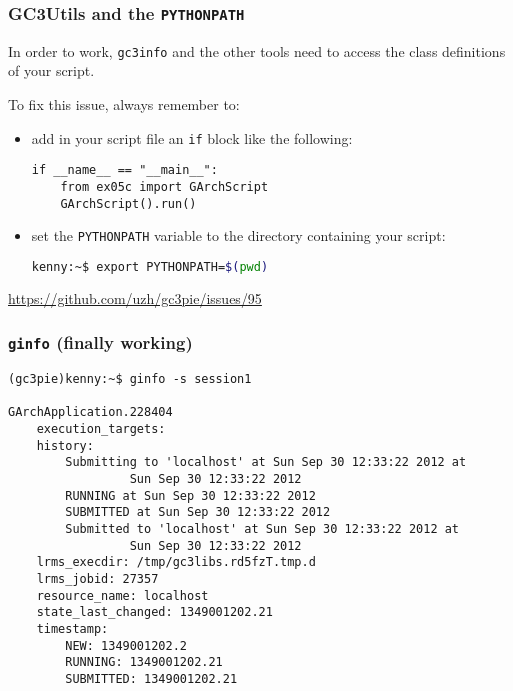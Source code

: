 \documentclass[english,serif,mathserif,xcolor=pdftex,dvipsnames,table]{beamer}
\begin{document}
\begin{frame}[fragile]
  \frametitle{GC3Utils and the \texttt{PYTHONPATH}}

  In order to work, \lstinline|gc3info| and the other tools need to
  access the class definitions of your script.

  \+
  To fix this issue, always remember to:
  \begin{itemize}

  \item add in your script file an \lstinline|if| block like the following:
    \begin{lstlisting}
if __name__ == "__main__":
    from ex05c import GArchScript
    GArchScript().run()
    \end{lstlisting}

  \item set the \lstinline|PYTHONPATH| variable to the directory
    containing your script:
    \begin{lstlisting}[language=sh]
      kenny:~$ export PYTHONPATH=$(pwd)
    \end{lstlisting}%
  \end{itemize}

  \begin{references}
    \url{https://github.com/uzh/gc3pie/issues/95}
  \end{references}

\end{frame}

\begin{frame}[fragile]
  \frametitle{\texttt{ginfo} (finally working)}
  \begin{lstlisting}[basicstyle=\tt\scriptsize]
    (gc3pie)kenny:~$ ginfo -s session1

GArchApplication.228404
    execution_targets: 
    history: 
        Submitting to 'localhost' at Sun Sep 30 12:33:22 2012 at 
                 Sun Sep 30 12:33:22 2012
        RUNNING at Sun Sep 30 12:33:22 2012
        SUBMITTED at Sun Sep 30 12:33:22 2012
        Submitted to 'localhost' at Sun Sep 30 12:33:22 2012 at 
                 Sun Sep 30 12:33:22 2012
    lrms_execdir: /tmp/gc3libs.rd5fzT.tmp.d
    lrms_jobid: 27357
    resource_name: localhost
    state_last_changed: 1349001202.21
    timestamp: 
        NEW: 1349001202.2
        RUNNING: 1349001202.21
        SUBMITTED: 1349001202.21
  \end{lstlisting}%
\end{frame}
\end{document}
